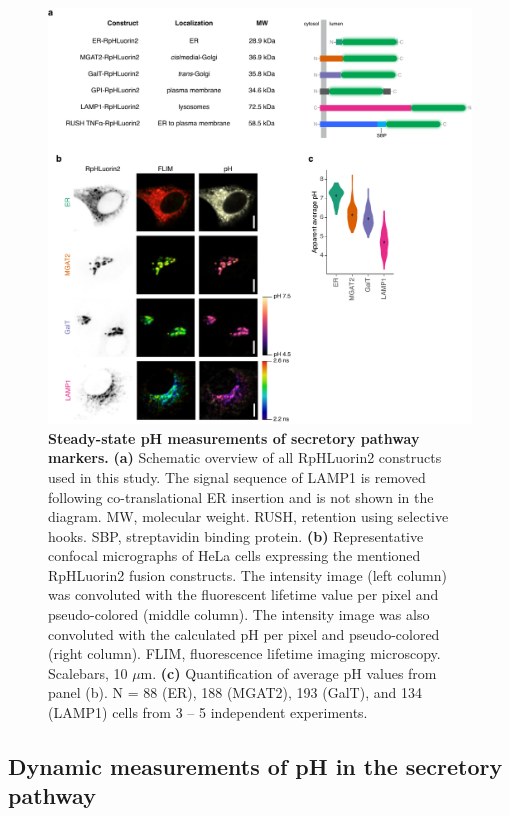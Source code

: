 \begin{figure}
    \includegraphics[keepaspectratio=true,width=\textwidth,height=\textheight]{chapters/chapter3/chapter3_Figure3.pdf}
    \caption{\textbf{Steady-state pH measurements of secretory pathway markers.} \textbf{(a)} Schematic overview of all RpHLuorin2 constructs used in this study. The signal sequence of LAMP1 is removed following co-translational ER insertion and is not shown in the diagram. MW, molecular weight. RUSH, retention using selective hooks\cite{boncompain_synchronization_2012}. SBP, streptavidin binding protein. \textbf{(b)} Representative confocal micrographs of HeLa cells expressing the mentioned RpHLuorin2 fusion constructs. The intensity image (left column) was convoluted with the fluorescent lifetime value per pixel and pseudo-colored (middle column). The intensity image was also convoluted with the calculated pH per pixel and pseudo-colored (right column). FLIM, fluorescence lifetime imaging microscopy. Scalebars, 10 $\mu$m. \textbf{(c)} Quantification of average pH values from panel (b). N = 88 (ER), 188 (MGAT2), 193 (GalT), and 134 (LAMP1) cells from 3 – 5 independent experiments.}
    \label{fig:ch3fig3}
\end{figure}

\subsection{Dynamic measurements of pH in the secretory pathway}

